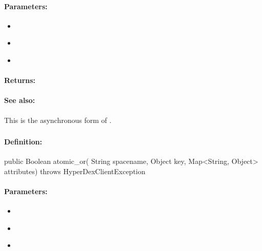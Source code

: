 \paragraph{Parameters:}
\begin{itemize}[noitemsep]
\item {}\\

\item {}\\

\item {}\\

\end{itemize}

\paragraph{Returns:}


\paragraph{See also:}  This is the asynchronous form of .

\pagebreak
\subsubsection{}
\label{api:java:atomic_or}


\paragraph{Definition:}
\begin{javacode}
public Boolean atomic_or(
        String spacename,
        Object key,
        Map<String, Object> attributes) throws HyperDexClientException
\end{javacode}

\paragraph{Parameters:}
\begin{itemize}[noitemsep]
\item {}\\

\item {}\\

\item {}\\

\end{itemize}

